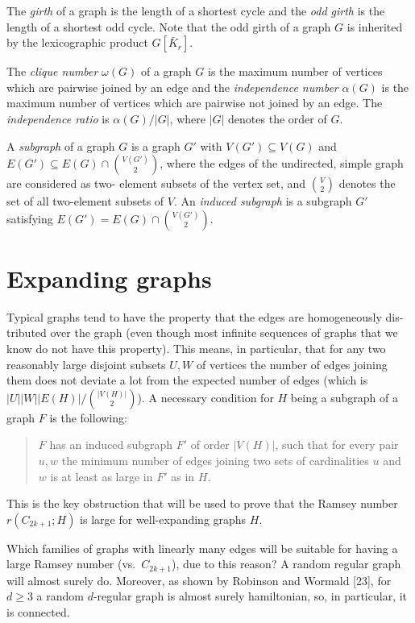 \documentclass[12pt,a4paper]{article}
\begin{document}
The \emph{girth} of a graph is the length of a shortest cycle and the \emph{odd girth} is the
length of a shortest odd cycle. Note that the odd girth of a graph $G$ is inherited by
the lexicographic product $G[\bar{K}_r]$.

The \emph{clique number} $\omega(G)$ of a graph $G$ is the maximum number of vertices which
are pairwise joined by an edge and the \emph{independence number} $\alpha(G)$ is the maximum
number of vertices which are pairwise not joined by an edge. The \emph{independence ratio}
is $\alpha(G)/|G|$, where $|G|$ denotes the order of $G$.

A \emph{subgraph} of a graph $G$ is a graph $G'$ with $V(G')\subseteq V(G)$ and $E(G')\subseteq E(G)\cap
\binom{V(G')}{2}$, where the edges of the undirected, simple graph are considered as two-
element subsets of the vertex set, and $\binom{V}{2}$ denotes the set of all two-element subsets
of $V$. An \emph{induced subgraph} is a subgraph $G'$ satisfying $E(G')=E(G)\cap\binom{V(G')}{2}$.

\section{Expanding graphs}

Typical graphs tend to have the property that the edges are homogeneously dis-
tributed over the graph (even though most infinite sequences of graphs that we know
do not have this property). This means, in particular, that for any two reasonably
large disjoint subsets $U,W$ of vertices the number of edges joining them does not
deviate a lot from the expected number of edges (which is $|U||W||E(H)|/\binom{|V(H)|}{2}$).
A necessary condition for $H$ being a subgraph of a graph $F$ is the following:

\begin{quote}
$F$ has an induced subgraph $F'$ of order $|V(H)|$, such that for every pair
$u,w$ the minimum number of edges joining two sets of cardinalities $u$
and $w$ is at least as large in $F'$ as in $H$.
\end{quote}

This is the key obstruction that will be used to prove that the Ramsey number
$r(C_{2k+1};H)$ is large for well-expanding graphs $H$.

Which families of graphs with linearly many edges will be suitable for having
a large Ramsey number (vs.\ $C_{2k+1}$), due to this reason? A random regular graph
will almost surely do. Moreover, as shown by Robinson and Wormald [23], for
$d\ge 3$ a random $d$-regular graph is almost surely hamiltonian, so, in particular, it is
connected.
\end{document}
